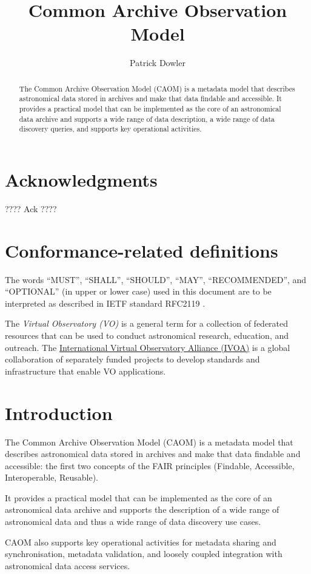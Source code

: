 \documentclass[11pt,a4paper]{ivoa}
\title{Common Archive Observation Model}
\author[https://wiki.ivoa.net/twiki/bin/view/IVOA/PatrickDowler]{Patrick Dowler}
\begin{document}
\begin{abstract}
The Common Archive Observation Model (CAOM) is a metadata model that describes
astronomical data stored in archives and make that data findable and accessible.
It provides a practical model that can be implemented as the core of an astronomical
data archive and supports a wide range of data description, a wide range of 
data discovery queries, and supports key operational activities.
\end{abstract}


\section*{Acknowledgments}

???? Ack ????

\section*{Conformance-related definitions}

The words ``MUST'', ``SHALL'', ``SHOULD'', ``MAY'', ``RECOMMENDED'', and
``OPTIONAL'' (in upper or lower case) used in this document are to be
interpreted as described in IETF standard RFC2119 \citep{std:RFC2119}.

The \emph{Virtual Observatory (VO)} is a
general term for a collection of federated resources that can be used
to conduct astronomical research, education, and outreach.
The \href{https://www.ivoa.net}{International
Virtual Observatory Alliance (IVOA)} is a global
collaboration of separately funded projects to develop standards and
infrastructure that enable VO applications.


\section{Introduction}

The Common Archive Observation Model (CAOM) is a metadata model that describes
astronomical data stored in archives and make that data findable and accessible: 
the first two concepts of the FAIR principles (Findable, Accessible, Interoperable,
Reusable). 

It provides a practical model that can be implemented as the core of an astronomical
data archive and supports the description of a wide range of astronomical data and thus
a wide range of data discovery use cases.

CAOM also supports key operational activities for metadata sharing and synchronisation,
metadata validation, and loosely coupled integration with astronomical data access services.
\end{document}
